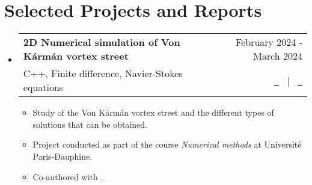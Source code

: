 \documentclass[a4paper,11pt]{article}
\makeatletter
\newcommand{\resumeQuadHeading}[4]{
  \item
  \begin{tabular*}{0.96\textwidth}[t]{l@{\extracolsep{\fill}}r}
    \textbf{#1} & \small #2 \\
    \small#3 & \small #4 \\
  \end{tabular*}
}
\newcommand{\resumeHeadingListStart}{
  \begin{itemize}[leftmargin=0.15in, label={}]
}
\newcommand{\resumeHeadingListEnd}{\end{itemize}}
\makeatother
\begin{document}
\section{Selected Projects and Reports}

\resumeHeadingListStart{}
\resumeQuadHeading{2D Numerical simulation of Von Kármán vortex street}{February 2024 - March 2024}{C++, Finite difference, Navier-Stokes equations}{\href{https://github.com/victorballester7/von-karman/releases/latest/download/main.pdf}{\faFileTextO \ \graydotuline{Report}} \ $|$ \ \href{https://github.com/victorballester7/von-karman/tree/main}{\faGithub \ \graydotuline{Code}}}
\begin{itemize}[leftmargin=3em, itemsep=0.1em, topsep=2pt]
  \item \small Study of the Von Kármán vortex street and the different types of solutions that can be obtained.
  \item \small Project conducted as part of the course \textit{Numerical methods} at Université Paris-Dauphine.
  \item \small Co-authored with \href{https://www.linkedin.com/in/jona-nägerl-3910a5243/}{}.
\end{itemize}
\resumeHeadingListEnd{}
\end{document}
